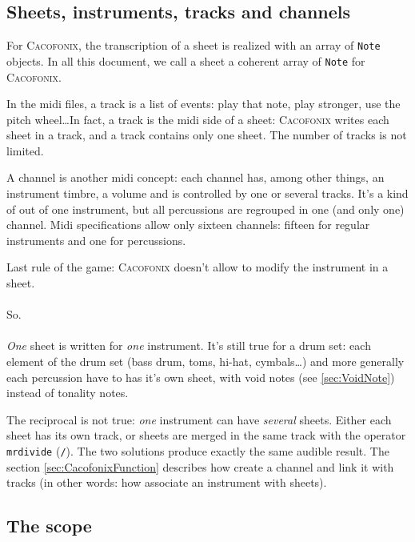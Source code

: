 \documentclass{article}
\newcommand{\cacofonix}{\textsc{Cacofonix}\xspace}
\newcommand{\note}{\lstinline!Note!\xspace}
\begin{document}
\subsection{Sheets, instruments, tracks and channels}
\label{sec:SITandC}

For \cacofonix, the transcription of a sheet is realized with an array of \note objects. In all this document, we call a sheet a coherent array of \note for \cacofonix.

In the midi files, a track is a list of events: play that note, play stronger, use the pitch wheel\dots In fact, a track is the midi side of a sheet: \cacofonix writes each sheet in a track, and a track contains only one sheet. The number of tracks is not limited.

A channel is another midi concept: each channel has, among other things, an instrument timbre, a volume and is controlled by one or several tracks. It's a kind of out of one instrument, but all percussions are regrouped in one (and only one) channel. Midi specifications allow only sixteen channels: fifteen for regular instruments and one for percussions.

Last rule of the game: \cacofonix doesn't allow to modify the instrument in a sheet.

\paragraph{}

So.

\paragraph{}

\emph{One} sheet is written for \emph{one} instrument. It's still true for a drum set: each element of the drum set (bass drum, toms, hi-hat, cymbals\dots) and more generally each percussion have to has it's own sheet, with void notes (see \ref{sec:VoidNote}) instead of tonality notes.

The reciprocal is not true: \emph{one} instrument can have \emph{several} sheets. Either each sheet has its own track, or sheets are merged in the same track with the operator \lstinline!mrdivide! (\lstinline!/!). The two solutions produce exactly the same audible result. The section \ref{sec:CacofonixFunction} describes how create a channel and link it with tracks (in other words: how associate an instrument with sheets).

\subsection{The scope}
\label{sec:scope}
\end{document}
